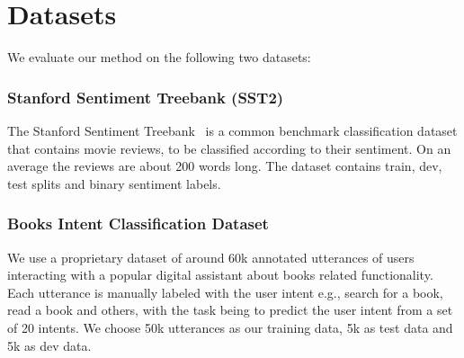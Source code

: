 \section{Datasets}
\label{sec:data}
We evaluate our method on the following two datasets:
\subsubsection{Stanford Sentiment Treebank (SST2)}
The Stanford Sentiment Treebank~\cite{socher2013recursive} is a common benchmark classification dataset that contains movie reviews, to be classified according to their sentiment. On an average the reviews are about 200 words long. The dataset contains train, dev, test splits and binary sentiment labels. 
\subsubsection{Books Intent Classification Dataset}
We use a proprietary dataset of around 60k annotated utterances of users interacting with a popular digital assistant about books related functionality. Each utterance is manually labeled with the user intent e.g., search for a book, read a book and others, with the task being to predict the user intent from a set of 20 intents. We choose 50k utterances as our training data, 5k as test data and 5k as dev data.

